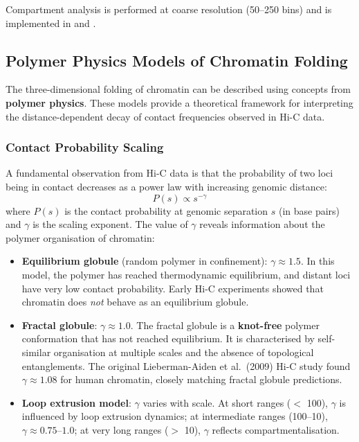 Compartment analysis is performed at coarse resolution (50--250\kilobase{} bins) and is implemented in  and .

\subsection{Polymer Physics Models of Chromatin Folding}
\label{subsec:3dgenome:polymer-physics}

The three-dimensional folding of chromatin can be described using concepts from \textbf{polymer physics}. These models provide a theoretical framework for interpreting the distance-dependent decay of contact frequencies observed in Hi-C data.

\subsubsection{Contact Probability Scaling}

A fundamental observation from Hi-C data is that the probability of two loci being in contact decreases as a power law with increasing genomic distance:
\begin{equation}
\label{eq:3dgenome:contact-scaling}
P(s) \propto s^{-\gamma}
\end{equation}
where $P(s)$ is the contact probability at genomic separation $s$ (in base pairs) and $\gamma$ is the scaling exponent. The value of $\gamma$ reveals information about the polymer organisation of chromatin:

\begin{itemize}[itemsep=3pt]
  \item \textbf{Equilibrium globule} (random polymer in confinement): $\gamma \approx 1.5$. In this model, the polymer has reached thermodynamic equilibrium, and distant loci have very low contact probability. Early Hi-C experiments showed that chromatin does \textit{not} behave as an equilibrium globule.
  \item \textbf{Fractal globule}: $\gamma \approx 1.0$. The fractal globule is a \textbf{knot-free} polymer conformation that has not reached equilibrium. It is characterised by self-similar organisation at multiple scales and the absence of topological entanglements. The original Lieberman-Aiden et al.\ (2009) Hi-C study found $\gamma \approx 1.08$ for human chromatin, closely matching fractal globule predictions.
  \item \textbf{Loop extrusion model}: $\gamma$ varies with scale. At short ranges ($<$ 100\kilobase{}), $\gamma$ is influenced by loop extrusion dynamics; at intermediate ranges (100\kilobase{}--10\megabase{}), $\gamma \approx 0.75$--$1.0$; at very long ranges ($>$ 10\megabase{}), $\gamma$ reflects compartmentalisation.
\end{itemize}

